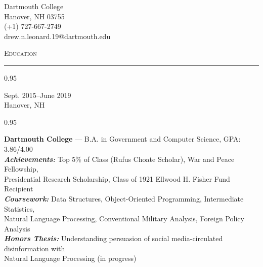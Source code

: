 \documentclass[a4paper,9pt]{article}
\newcommand{\mainMarginBottom}{\vspace*{2.5pt}}
\newcommand{\newLine}{\\}
\newcommand{\doubleColumnGap}{\hspace{4mm}}
\newcommand{\sectionMarginTopBottom}{\vspace*{9pt}}
\newcommand{\sectionMarginBetweenAdd}{\vspace{20pt}}
\newcommand{\mainLineSpacing}{0.95}
\newcommand{\titleMarginBelow}{\vspace*{2ex}}
\def\hrulefill{\leavevmode\leaders\hrule height 1.75pt\hfill\kern0pt}
\begin{document}
\begin{minipage}[b]{0.70\linewidth}
\end{minipage}
\begin{minipage}[b]{0.29\linewidth}
  \begin{flushright}
    \begin{small}
      Dartmouth College
      \newLine{}
      \mainMarginBottom{}
      Hanover, NH 03755
      \newLine{}
      \mainMarginBottom{}
      (+1) 727-667-2749
      \newLine{}
      \mainMarginBottom{}
      drew.n.leonard.19@dartmouth.edu
    \end{small}
  \end{flushright}
\end{minipage}

\titleMarginBelow{}
\sectionMarginBetweenAdd{}

\hspace*{12pt}\textsc{\fontsize{20}{24}\selectfont Education}\hspace*{14pt}\hrulefill
\sectionMarginTopBottom{}

\begin{minipage}[t]{0.20\linewidth}
  \begin{small}
    \begin{spacing}\mainLineSpacing{}
      \begin{flushright}
        Sept. 2015--June 2019
        \newLine{}
        \mainMarginBottom{}
        Hanover, NH
      \end{flushright}
    \end{spacing}
  \end{small}
\end{minipage}
\doubleColumnGap{}
\begin{minipage}[t]{0.75\linewidth}
  \begin{small}
    \begin{spacing}\mainLineSpacing{}
      \begin{flushleft}
        \textbf{Dartmouth College} --- B.A. in Government and Computer Science, GPA: 3.86/4.00
        \newLine{}
        \mainMarginBottom{}
        \textit{\textbf{Achievements:}} Top 5\% of Class (Rufus Choate Scholar), War and Peace Fellowship,\\ Presidential Research Scholarship, Class of 1921 Ellwood H. Fisher Fund Recipient
        \newLine{}
        \mainMarginBottom{}
        \textit{\textbf{Coursework:}} Data Structures, Object-Oriented Programming, Intermediate Statistics,
        \\ Natural Language Processing, Conventional Military Analysis, Foreign Policy Analysis
        \newLine{}
        \mainMarginBottom{}
        \textit{\textbf{Honors Thesis:}} Understanding persuasion of social media-circulated disinformation with\\ Natural Language Processing (in progress)
      \end{flushleft}
    \end{spacing}
  \end{small}
\end{minipage}
\end{document}
